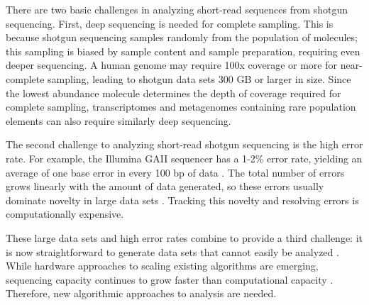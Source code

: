 \documentclass{pnastwo}
\begin{document}
\begin{article}
There are two basic challenges in analyzing short-read sequences from
shotgun sequencing. First, deep sequencing is needed for complete
sampling. This is because shotgun sequencing samples randomly from the
population of molecules; this sampling is biased by sample content and
sample preparation, requiring even deeper sequencing. A human genome
may require 100x coverage or more for near-complete sampling, leading
to shotgun data sets 300 GB or larger in size\cite{pubmed21187386}.
Since the lowest abundance molecule determines the depth of coverage
required for complete sampling, transcriptomes and metagenomes
containing rare population elements can also require similarly
deep sequencing.

The second challenge to analyzing short-read shotgun sequencing is the
high error rate.  For example, the Illumina GAII sequencer has a 1-2\% error
rate, yielding an average of one base error in every 100 bp of data
\cite{pubmed19997069}.  The total number of errors grows linearly with
the amount of data generated, so these errors usually dominate
novelty in large data sets \cite{pubmed21245053}.  Tracking this
novelty and resolving errors is computationally expensive.

These large data sets and high error rates combine to provide a third
challenge: it is now straightforward to generate data sets that cannot
easily be analyzed \cite{pubmed21867570}.  While hardware approaches
to scaling existing algorithms are emerging, sequencing capacity
continues to grow faster than computational capacity
\cite{pubmed20441614}.  Therefore, new algorithmic approaches to
analysis are needed.


\end{article}
\end{document}
